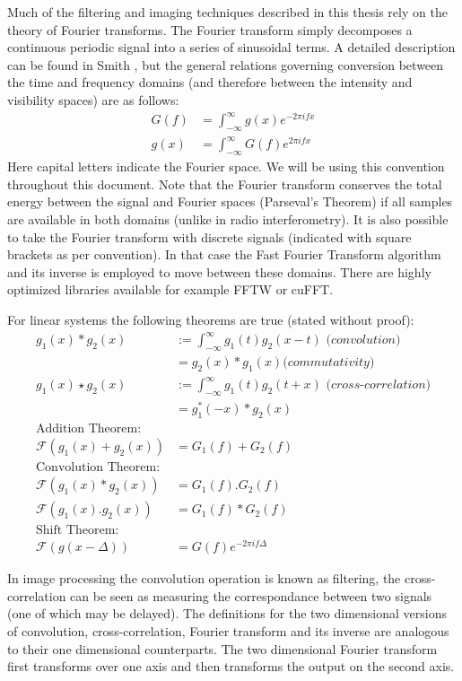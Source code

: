 Much of the filtering and imaging techniques described in this thesis rely on the theory of Fourier transforms. The Fourier transform simply decomposes a continuous periodic signal into a series of sinusoidal terms. A detailed description 
can be found in Smith \cite[ch 8-12,31]{smith1997scientist}, but the general relations governing conversion between the time and frequency domains (and therefore between the intensity and visibility spaces) are as follows:
\begin{equation*}
  \begin{split}
    G(f) &= \int_{-\infty}^{\infty}g(x)e^{-2\pi ifx}\\
    g(x) &= \int_{-\infty}^{\infty}G(f)e^{2\pi ifx}
  \end{split}
\end{equation*}
Here capital letters indicate the Fourier space. We will be using this convention throughout this document. Note that the Fourier transform conserves the total energy between the signal and Fourier spaces (Parseval's
Theorem) if all samples are available in both domains (unlike in radio interferometry). It is also possible to take the Fourier transform with discrete signals (indicated with square brackets as per convention). In that 
case the Fast Fourier Transform algorithm and its inverse is employed to move between these 
domains. There are highly optimized libraries available for example FFTW or cuFFT.

For linear systems the following theorems are true (stated without proof):
\begin{equation*}
  \begin{split}
    g_1(x)*g_2(x) &:= \int_{-\infty}^{\infty}g_1(t)g_2(x-t)\textit{ (convolution)}\\
    &=g_2(x)*g_1(x)\textit{(commutativity)}\\
    g_1(x)\star g_2(x) &:= \int_{-\infty}^{\infty}g_1(t)g_2(t+x)\textit{ (cross-correlation)}\\
    &=g_1^*(-x)*g_2(x)\\
    \text{Addition Theorem:}\\
    \mathcal{F}(g_1(x)+g_2(x)) &= G_1(f)+G_2(f)\\
    \text{Convolution Theorem:}\\
    \mathcal{F}(g_1(x)*g_2(x)) &=G_1(f).G_2(f)\\
    \mathcal{F}(g_1(x).g_2(x)) &=G_1(f)*G_2(f)\\
    \text{Shift Theorem:}\\
    \mathcal{F}(g(x-\Delta))&=G(f)e^{-2\pi if\Delta}
  \end{split}
\end{equation*}

In image processing the convolution operation is known as filtering, the cross-correlation can be seen as measuring the correspondance between two signals (one of which may be delayed). The definitions for the two dimensional 
versions of convolution, cross-correlation, Fourier transform and its inverse are analogous to their one dimensional counterparts. The two dimensional Fourier transform first transforms over one axis and then 
transforms the output on the second axis.